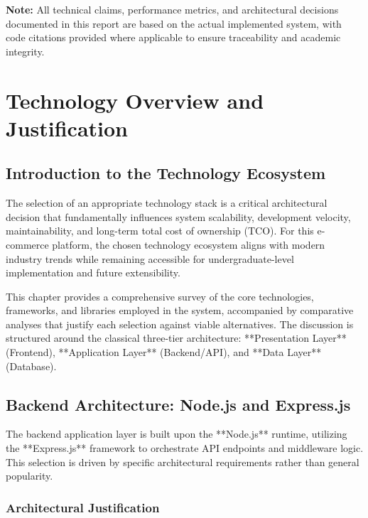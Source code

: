 \documentclass[12pt, a4paper]{report}
\begin{document}
\vspace{1cm}
\noindent \textbf{Note:} All technical claims, performance metrics, and architectural decisions documented in this report are based on the actual implemented system, with code citations provided where applicable to ensure traceability and academic integrity.


\chapter{Technology Overview and Justification}

\section{Introduction to the Technology Ecosystem}

The selection of an appropriate technology stack is a critical architectural decision that fundamentally influences system scalability, development velocity, maintainability, and long-term total cost of ownership (TCO). For this e-commerce platform, the chosen technology ecosystem aligns with modern industry trends while remaining accessible for undergraduate-level implementation and future extensibility.

This chapter provides a comprehensive survey of the core technologies, frameworks, and libraries employed in the system, accompanied by comparative analyses that justify each selection against viable alternatives. The discussion is structured around the classical three-tier architecture: **Presentation Layer** (Frontend), **Application Layer** (Backend/API), and **Data Layer** (Database).

\section{Backend Architecture: Node.js and Express.js}

The backend application layer is built upon the **Node.js** runtime, utilizing the **Express.js** framework to orchestrate API endpoints and middleware logic. This selection is driven by specific architectural requirements rather than general popularity.

\subsection{Architectural Justification}
\end{document}
